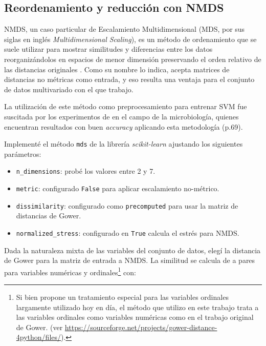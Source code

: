 \documentclass[10 pt]{article}
\begin{document}
\subsection{Reordenamiento y reducción con NMDS}\label{NMDS}

NMDS, un caso particular de Escalamiento Multidimensional (MDS, por sus siglas en inglés \textit{Multidimensional Scaling}), es un método de ordenamiento que se suele utilizar para mostrar similitudes y diferencias entre los datos reorganizándolos en espacios de menor dimensión preservando el orden relativo de las distancias originales \citetext{\citealp[p. 218]{aid}}. Como su nombre lo indica, acepta matrices de distancias no métricas como entrada, y eso resulta una ventaja para el conjunto de datos multivariado con el que trabajo. 

La utilización de este método como preprocesamiento para entrenar SVM fue suscitada por los experimentos de \citeauthor{cai2019incorporating}\citeyearpar{cai2019incorporating} en el campo de la microbiología, quienes encuentran resultados con buen \textit{accuracy} aplicando esta metodología (p.69).

Implementé el método \texttt{mds} de la librería \textit{scikit-learn}\citetext{\citealp{scikit-learn}} ajustando los siguientes parámetros:

\begin{itemize}
    \item \texttt{n\_dimensions}: probé los valores entre 2 y 7.
    \item \texttt{metric}: configurado \texttt{False} para aplicar escalamiento no-métrico. 
    \item \texttt{dissimilarity}: configurado como \texttt{precomputed} para usar la matriz de distancias de Gower.
    \item \texttt{normalized\_stress}: configurado en \texttt{True} calcula el estrés para NMDS.
 \end{itemize}

Dada la naturaleza mixta de las variables del conjunto de datos, elegí la distancia de Gower para la matriz de entrada a NMDS. La similitud se calcula de a pares para variables numéricas y ordinales\footnote{Si bien \cite{podani1999extending} propone un tratamiento especial para las variables ordinales largamente utilizado hoy en día, el método que utilizo en este trabajo trata a las variables ordinales como variables numéricas como en el trabajo original de Gower. (ver \url{https://sourceforge.net/projects/gower-distance-4python/files/}).} con:
\end{document}
